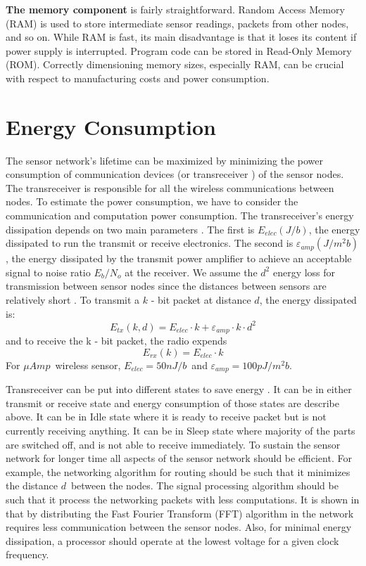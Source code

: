 	\textbf{The memory component} is fairly straightforward. 
		Random Access Memory (RAM) is used to store intermediate sensor readings, packets from other nodes, and so on. 
		While RAM is fast, its main disadvantage is that it loses its content if power supply is interrupted. 
		Program code can be stored in Read-Only Memory (ROM). 
		Correctly dimensioning memory sizes, especially RAM, can be crucial with respect to manufacturing costs and power consumption.

\section{Energy Consumption}

	The sensor network's lifetime can be maximized by minimizing the power consumption of communication devices (or transreceiver ) of the sensor nodes.
	The transreceiver is responsible for all the wireless communications between nodes.
	To estimate the power consumption, we have to consider the communication and computation power consumption.
	The transreceiver's energy dissipation depends on two main parameters \cite{wang2002energy}.
	The first is $E_{elec} (J/b)$, the energy dissipated to run the transmit or receive electronics.
	The second is $\varepsilon_{amp} (J/m^2 b)$, the energy dissipated by the transmit power amplifier to achieve an acceptable signal to noise ratio $E_{b} / N_{o} $ at the receiver.
	We assume the $d^2$ energy loss for transmission between sensor nodes since the distances between sensors are relatively short \cite{ettus1998system}. 
	To transmit a $k$ - bit packet at distance $d$, the energy dissipated is:
	\begin{equation}
		E_{tx}(k, d) = E_{elec} \cdot k + \varepsilon_{amp} \cdot k \cdot d^{2}
	\end{equation}
	and to receive the k - bit packet, the radio expends
	\begin{equation}
		E_{rx}(k) = E_{elec} \cdot k
	\end{equation}
	For $\mu Amp$\ wireless sensor, $E_{elec} = 50nJ/b$\ and $\varepsilon_{amp} = 100pJ/m^2 b$.

	Transreceiver can be put into different states to save energy \cite{karl2007protocols}.
	It can be in either transmit or receive state and energy consumption of those states are describe above.
	It can be in Idle state where it is ready to receive packet but is not currently receiving anything.
	It can be in Sleep state where majority of the parts are switched off, and is not able to receive immediately. 
 	To sustain the sensor network for longer time all aspects of the sensor network should be efficient.
	For example, the networking algorithm for routing should be such that it minimizes the distance $d$\ between the nodes.
	The signal processing algorithm should be such that it process the networking packets with less computations.
	It is shown in \cite{wang2002energy} that by distributing the Fast Fourier Transform (FFT) algorithm in the network requires less communication between the sensor nodes.
	Also, for minimal energy dissipation, a processor should operate at the lowest voltage for a given clock frequency.

